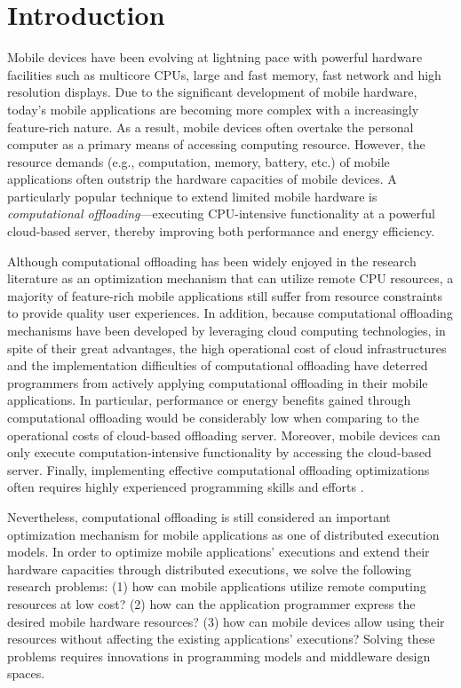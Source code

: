 \documentclass{sig-alternate}
\begin{document}
\section{Introduction}
Mobile devices have been evolving at lightning pace with powerful hardware facilities such as multicore CPUs, large and fast memory, fast network and high resolution displays. Due to the significant development of mobile hardware, today's mobile applications are becoming more complex with a increasingly feature-rich nature. As a result, mobile devices often overtake the personal computer as a primary means of accessing computing resource. However, the resource demands (e.g., computation, memory, battery, etc.) of mobile applications often outstrip the hardware capacities of mobile devices. A particularly popular technique to extend limited mobile hardware is \emph{computational offloading}---executing CPU-intensive functionality at a powerful cloud-based server, thereby improving both performance and energy efficiency. 

Although computational offloading has been widely enjoyed in the research literature as an optimization mechanism that can utilize remote CPU resources, a majority of feature-rich mobile applications still suffer from resource constraints to provide quality user experiences. In addition, because computational offloading mechanisms have been developed by leveraging cloud computing technologies, in spite of their great advantages, the high operational cost of cloud infrastructures and the implementation difficulties of computational offloading have deterred programmers from actively applying computational offloading in their mobile applications. In particular, performance or energy benefits gained through computational offloading would be considerably low when comparing to the operational costs of cloud-based offloading server. Moreover, mobile devices can only execute computation-intensive functionality by accessing the cloud-based server. Finally, implementing effective computational offloading optimizations often requires highly experienced programming skills and efforts \cite{kwon+:mobilesoft2015}.

Nevertheless, computational offloading is still considered an important optimization mechanism for mobile applications as one of distributed execution models. In order to optimize mobile applications' executions and extend their hardware capacities through distributed executions, we solve the following research problems: (1) how can mobile applications utilize remote computing resources at low cost? (2) how can the application programmer express the desired mobile hardware resources? (3) how can mobile devices allow using their resources without affecting the existing applications' executions? Solving these problems requires innovations in programming models and middleware design spaces. 
\end{document}
